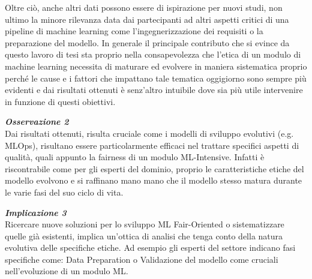     Oltre ciò, anche altri dati possono essere di ispirazione per nuovi studi, non ultimo la minore rilevanza data dai partecipanti ad altri aspetti critici di una pipeline di machine learning come l'ingegnerizzazione dei requisiti o la preparazione del modello. In generale il principale contributo che si evince da questo lavoro di tesi sta proprio nella consapevolezza che l'etica di un modulo di machine learning necessita di maturare ed evolvere in maniera sistematica proprio perché le cause e i fattori che impattano tale tematica oggigiorno sono sempre più evidenti e dai risultati ottenuti è senz'altro intuibile dove sia più utile intervenire in funzione di questi obiettivi.
    
    \begin{center}
	
        \begin{tcolorbox}[width=\textwidth, colframe=black, colback=Gray]
    			\begin{minipage}{\textwidth}
    				\textit{\faSearch  \textbf{ Osservazione 2}}\\
    		     Dai risultati ottenuti, risulta cruciale come i modelli di sviluppo evolutivi (e.g. MLOps), risultano essere particolarmente efficaci nel trattare specifici aspetti di qualità, quali appunto la fairness di un modulo ML-Intensive. Infatti è riscontrabile come per gli esperti del dominio, proprio le caratteristiche etiche del modello evolvono e si raffinano mano mano che il modello stesso matura durante le varie fasi del suo ciclo di vita.
    			\end{minipage}
		\end{tcolorbox}
	\end{center}
	
	 \begin{center}
	
        \begin{tcolorbox}[width=\textwidth, colframe=black, colback=Gray]
    			\begin{minipage}{\textwidth}
    				\textit{\faCaretSquareORight  \textbf{ Implicazione 3}}\\
    		    Ricercare nuove soluzioni per lo sviluppo ML Fair-Oriented o sistematizzare quelle già esistenti, implica un'ottica di analisi che tenga conto della natura evolutiva delle specifiche etiche. Ad esempio gli esperti del settore indicano  fasi specifiche come: Data Preparation o Validazione del modello come cruciali nell'evoluzione di un modulo ML.
    			\end{minipage}
		\end{tcolorbox}
	\end{center}
	
